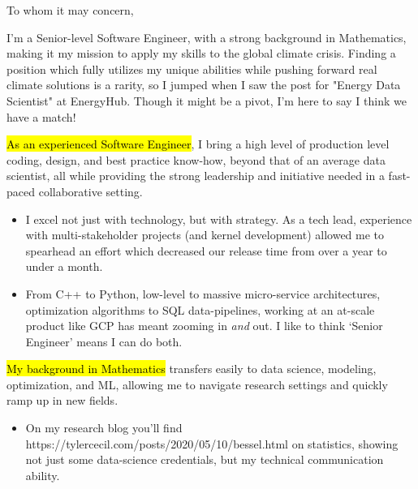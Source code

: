 \documentclass{tc_cv}
\begin{document}

\begin{adjustwidth}{38pt}{38pt}
  \large

  To whom it may concern,\par \medbreak

  \medbreak

  I'm a Senior-level Software Engineer, with a strong background in
  Mathematics, making it my mission to apply my skills to the global climate
  crisis. Finding a position which fully utilizes my unique abilities while
  pushing forward real climate solutions is a rarity, so I jumped when I saw
  the post for "Energy Data Scientist" at EnergyHub. Though it might be a
  pivot, I'm here to say I think we have a match! \medbreak

  \hl{As an experienced Software Engineer}, I bring a high level of production
  level coding, design, and best practice know-how, beyond that of an average
  data scientist, all while providing the strong leadership and initiative
  needed in a fast-paced collaborative setting.
  \begin{itemize}

    \item I excel not just with technology, but with strategy. As a tech lead,
      experience with multi-stakeholder projects (and kernel development)
      allowed me to spearhead an effort which decreased our release time from
      over a year to under a month.

    \item From C++ to Python, low-level to massive micro-service architectures,
      optimization algorithms to SQL data-pipelines, working at an at-scale
      product like GCP has meant zooming in \emph{and} out. I like to think
      `Senior Engineer' means I can do both.

  \end{itemize} \medbreak

  \hl{My background in Mathematics} transfers easily to data science, modeling,
  optimization, and ML, allowing me to navigate research settings and quickly
  ramp up in new fields.
  \begin{itemize}

    \item On my research blog you'll find \cite{Jupyter
      notebooks}{https://tylercecil.com/posts/2020/05/10/bessel.html} on
      statistics, showing not just some data-science credentials, but my
      technical communication ability.


\end{itemize}
\end{adjustwidth}
\end{document}
